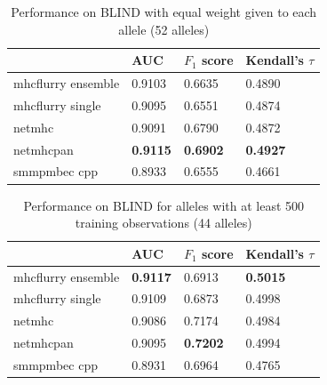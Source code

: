 \begin{table}[h]
\centering
\begin{tabular}{llll}
\toprule
{} &              AUC &      $F_1$ score & Kendall's $\tau$ \\
\midrule
mhcflurry ensemble &           0.9103 &           0.6635 &           0.4890 \\
mhcflurry single   &           0.9095 &           0.6551 &           0.4874 \\
netmhc             &           0.9091 &           0.6790 &           0.4872 \\
netmhcpan          &  \textbf{0.9115} &  \textbf{0.6902} &  \textbf{0.4927} \\
smmpmbec cpp       &           0.8933 &           0.6555 &           0.4661 \\
\bottomrule
\end{tabular}

\caption{Performance on BLIND with equal weight given to each allele (52 alleles)}
\label{tab:alleleweighted}
\end{table}

\begin{table}[h]
\centering
\begin{tabular}{llll}
\toprule
{} &              AUC &      $F_1$ score & Kendall's $\tau$ \\
\midrule
mhcflurry ensemble &  \textbf{0.9117} &           0.6913 &  \textbf{0.5015} \\
mhcflurry single   &           0.9109 &           0.6873 &           0.4998 \\
netmhc             &           0.9086 &           0.7174 &           0.4984 \\
netmhcpan          &           0.9095 &  \textbf{0.7202} &           0.4994 \\
smmpmbec cpp       &           0.8931 &           0.6964 &           0.4765 \\
\bottomrule
\end{tabular}

\caption{Performance on BLIND for alleles with at least 500 training observations (44 alleles)}
\label{tab:alleleweightedbig}
\end{table}

